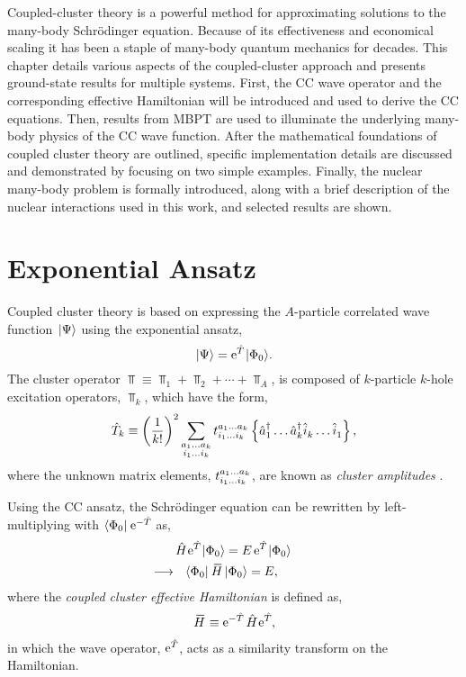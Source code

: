 \documentclass[thesis.tex]{subfiles}
\begin{document}
Coupled-cluster theory is a powerful method for approximating solutions to the many-body Schr\"odinger equation.  Because of its effectiveness and economical scaling it has been a staple of many-body quantum mechanics for decades.  This chapter details various aspects of the coupled-cluster approach and presents ground-state results for multiple systems.  First, the CC wave operator and the corresponding effective Hamiltonian will be introduced and used to derive the CC equations.  Then, results from MBPT are used to illuminate the underlying many-body physics of the CC wave function.  After the mathematical foundations of coupled cluster theory are outlined, specific implementation details are discussed and demonstrated by focusing on two simple examples.  Finally, the nuclear many-body problem is formally introduced, along with a brief description of the nuclear interactions used in this work, and selected results are shown.

\section{Exponential Ansatz} \label{section:exponentialansatz}

Coupled cluster theory is based on expressing the $A$-particle correlated wave function $\hspace{1pt}\lvert \Psi \rangle$ using the exponential ansatz,
\begin{equation} \label{eq:cc_ansatz}
  \hspace{1pt}\lvert \Psi \rangle = \operatorname{e}^{\hat{T}\hspace{-0.25pt}}\hspace{1pt}\lvert \Phi_{0} \rangle.
\end{equation}
The cluster operator $\Top \equiv \Top_{1} + \Top_{2} + \cdots + \Top_{A}$, is composed of $k$-particle $k$-hole excitation operators, $\Top_{k}$, which have the form,
\begin{equation} \label{eq:cc_amps}
  \hat{T}_{k} \equiv \left(\frac{1}{k!}\right)^2 \sum_{\substack{a_1 \ldots a_k \\ i_1 \ldots i_k}} t^{a_1 \ldots a_k}_{i_1 \ldots i_k}\left\{\hat{a}_{1}^\dagger \ldots \hat{a}_{k}^\dagger \hat{i}_{k}^{} \ldots \hat{i}_{1}^{}\right\},
\end{equation}
where the unknown matrix elements, $t^{a_1 \ldots a_k}_{i_1 \ldots i_k}$, are known as \textit{cluster amplitudes} \cite{SHAVITT2009}.

Using the CC ansatz, the Schr\"odinger equation can be rewritten by left-multiplying with $\langle \Phi_{0} |\hspace{1pt} \operatorname{e}^{-\hat{T}\hspace{-0.25pt}}$ as,
\begin{gather} \label{eq:cc_schrodeq}
  \Ham \E^{\Top} \refket = E \E^{\Top} \refket \notag \\
  \hspace{-1.0cm}\longrightarrow \ \ \refbra\EHam\refket = E,
\end{gather}
where the \textit{coupled cluster effective Hamiltonian} is defined as,
\begin{align} \label{eq:cc_heff0}
  \EHam \equiv \E^{-\Top} \Ham \E^{\Top},
\end{align}
in which the wave operator, $\operatorname{e}^{\hat{T}\hspace{-0.25pt}}$, acts as a similarity transform on the Hamiltonian.
\end{document}
